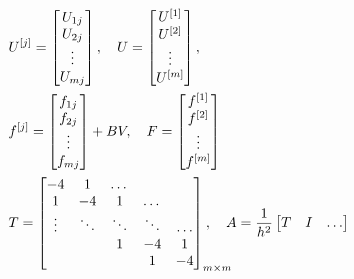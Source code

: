 \documentclass[../differential_methods.tex]{subfiles}
\begin{document}
\begin{align*}
	 & U^{[j]}=\begin{bmatrix}
		           U_{1j} \\
		           U_{2j} \\
		           \vdots \\
		           U_{mj}
	           \end{bmatrix},\quad  U = \begin{bmatrix}
		                                    U^{[1]} \\
		                                    U^{[2]} \\
		                                    \vdots  \\
		                                    U^{[m]}
	                                    \end{bmatrix},                                 \\
	 & f^{[j]}=\begin{bmatrix}
		           f_{1j} \\
		           f_{2j} \\
		           \vdots \\
		           f_{mj}
	           \end{bmatrix}+BV, \quad F = \begin{bmatrix}
		                                       f^{[1]} \\
		                                       f^{[2]} \\
		                                       \vdots  \\
		                                       f^{[m]}
	                                       \end{bmatrix}                              \\
	 & T = \begin{bmatrix}
		       -4     & 1      & \dotsc &        &        \\
		       1      & -4     & 1      & \dotsc &        \\
		       \vdots & \ddots & \ddots & \ddots & \dotsc \\
		              &        & 1      & -4     & 1      \\
		              &        &        & 1      & -4
	       \end{bmatrix}_{\mathrlap{m\times m}},\quad A = \frac{1}{h^{2}}\begin{bmatrix}
		                                                                     T      & I      & \dotsc                   \\

\end{bmatrix}
\end{align*}
\end{document}
